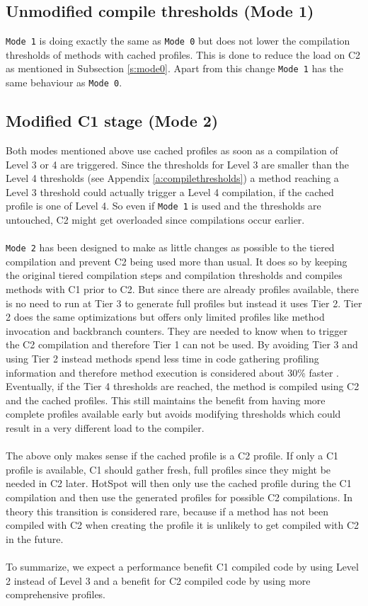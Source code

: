 \subsection{Unmodified compile thresholds (Mode 1)}
\label{s:mode1}
\texttt{Mode 1} is doing exactly the same as \texttt{Mode 0} but does not lower the compilation thresholds of methods with cached profiles.
This is done to reduce the load on C2 as mentioned in Subsection \ref{s:mode0}.
Apart from this change \texttt{Mode 1} has the same behaviour as \texttt{Mode 0}.
\subsection{Modified C1 stage (Mode 2)}
\label{s:mode2}
Both modes mentioned above use cached profiles as soon as a compilation of Level 3 or 4 are triggered. Since the thresholds for Level 3 are smaller than the Level 4 thresholds (see Appendix \ref{a:compilethresholds}) a method reaching a Level 3 threshold could actually trigger a Level 4 compilation, if the cached profile is one of Level 4. So even if \texttt{Mode 1} is used and the thresholds are untouched, C2 might get overloaded since compilations occur earlier.
\\\\
\texttt{Mode 2} has been designed to make as little changes as possible to the tiered compilation and prevent C2 being used more than usual. It does so by keeping the original tiered compilation steps and compilation thresholds and compiles methods with C1 prior to C2. But since there are already profiles available, there is no need to run at Tier 3 to generate full profiles but instead it uses Tier 2.
Tier 2 does the same optimizations but offers only limited profiles like method invocation and backbranch counters. They are needed to know when to trigger the C2 compilation and therefore Tier 1 can not be used. 
By avoiding Tier 3 and using Tier 2 instead methods spend less time in code gathering profiling information and therefore method execution is considered about 30\% faster \cite{code_atp_hpp}.
Eventually, if the Tier 4 thresholds are reached, the method is compiled using C2 and the cached profiles. This still maintains the benefit from having more complete profiles available early but avoids modifying thresholds which could result in a very different load to the compiler. 
\\\\
The above only makes sense if the cached profile is a C2 profile.
If only a C1 profile is available, C1 should gather fresh, full profiles since they might be needed in C2 later. HotSpot will then only use the cached profile during the C1 compilation and then use the generated profiles for possible C2 compilations.
In theory this transition is considered rare, because if a method has not been compiled with C2 when creating the profile it is unlikely to get compiled with C2 in the future.
\\\\
To summarize, we expect a performance benefit C1 compiled code by using Level 2 instead of Level 3 and a benefit for C2 compiled code by using more comprehensive profiles.

